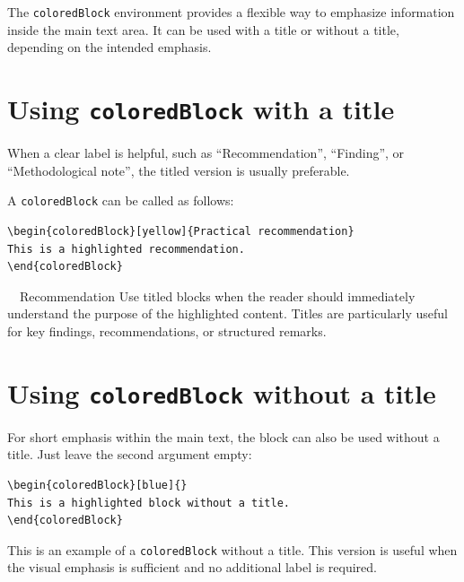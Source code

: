 \documentclass[11pt,a4paper]{report}
\begin{document}
The \texttt{coloredBlock} environment provides a flexible way to emphasize information inside the main text area. It can be used with a title or without a title, depending on the intended emphasis.

\section{Using \texttt{coloredBlock} with a title}

When a clear label is helpful, such as ``Recommendation'', ``Finding'', or ``Methodological note'', the titled version is usually preferable.

A \texttt{coloredBlock} can be called as follows:

\begin{coloredBlock}[grey]{}
\begin{verbatim}
\begin{coloredBlock}[yellow]{Practical recommendation}
This is a highlighted recommendation.
\end{coloredBlock}
\end{verbatim}
\end{coloredBlock}

\begin{coloredBlock}[yellow]{~~Recommendation}
Use titled blocks when the reader should immediately understand the purpose of the highlighted content. Titles are particularly useful for key findings, recommendations, or structured remarks.
\end{coloredBlock}

\section{Using \texttt{coloredBlock} without a title}

For short emphasis within the main text, the block can also be used without a title. Just leave the second argument empty:

\begin{coloredBlock}[grey]{}
\begin{verbatim}
\begin{coloredBlock}[blue]{}
This is a highlighted block without a title.
\end{coloredBlock}
\end{verbatim}
\end{coloredBlock}

\begin{coloredBlock}[blue]{}
This is an example of a \texttt{coloredBlock} without a title. This version is useful when the visual emphasis is sufficient and no additional label is required.
\end{coloredBlock}
\end{document}

